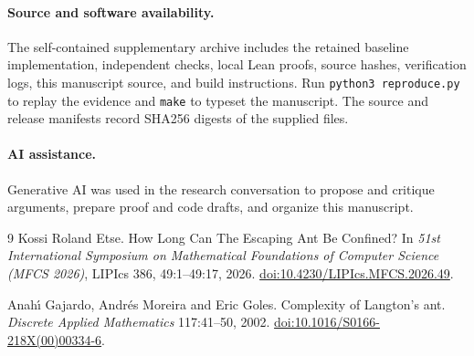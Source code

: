 \documentclass[11pt,a4paper]{article}
\theoremstyle{remark}\newtheorem{remark}[theorem]{Remark}
\begin{document}
\paragraph{Source and software availability.}
The self-contained supplementary archive includes the retained baseline
implementation, independent checks, local Lean proofs, source hashes,
verification logs, this manuscript source, and build instructions. Run \texttt{python3 reproduce.py} to replay the evidence and
\texttt{make} to typeset the manuscript. The source and release manifests
record SHA256 digests of the supplied files.

\paragraph{AI assistance.}
Generative AI was used in the research conversation to propose and critique
arguments, prepare proof and code drafts, and organize this manuscript.

\begin{thebibliography}{9}
Kossi Roland Etse.
\newblock How Long Can The Escaping Ant Be Confined?
\newblock In \emph{51st International Symposium on Mathematical Foundations of
Computer Science (MFCS 2026)}, LIPIcs 386, 49:1--49:17, 2026.
\newblock \href{https://doi.org/10.4230/LIPIcs.MFCS.2026.49}{doi:10.4230/LIPIcs.MFCS.2026.49}.

Anah\'{\i} Gajardo, Andr\'{e}s Moreira and Eric Goles.
\newblock Complexity of Langton's ant.
\newblock \emph{Discrete Applied Mathematics} 117:41--50, 2002.
\newblock \href{https://doi.org/10.1016/S0166-218X(00)00334-6}{doi:10.1016/S0166-218X(00)00334-6}.
\end{thebibliography}
\end{document}
